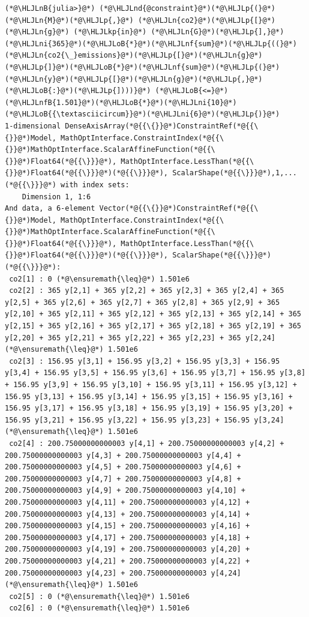 \documentclass[12pt,a4paper]{article}
\newcommand{\HLJLkp}[1]{\textcolor[RGB]{148,91,176}{\textbf{#1}}}
\newcommand{\HLJLn}[1]{#1}
\newcommand{\HLJLnd}[1]{\textcolor[RGB]{214,102,97}{#1}}
\newcommand{\HLJLnf}[1]{\textcolor[RGB]{66,102,213}{#1}}
\newcommand{\HLJLnB}[1]{\textcolor[RGB]{59,151,46}{#1}}
\newcommand{\HLJLnfB}[1]{\textcolor[RGB]{59,151,46}{#1}}
\newcommand{\HLJLni}[1]{\textcolor[RGB]{59,151,46}{#1}}
\newcommand{\HLJLoB}[1]{\textcolor[RGB]{102,102,102}{\textbf{#1}}}
\newcommand{\HLJLp}[1]{#1}
\begin{document}
\begin{lstlisting}
(*@\HLJLnB{julia>}@*) (*@\HLJLnd{@constraint}@*)(*@\HLJLp{(}@*)(*@\HLJLn{M}@*)(*@\HLJLp{,}@*) (*@\HLJLn{co2}@*)(*@\HLJLp{[}@*)(*@\HLJLn{g}@*) (*@\HLJLkp{in}@*) (*@\HLJLn{G}@*)(*@\HLJLp{],}@*) (*@\HLJLni{365}@*)(*@\HLJLoB{*}@*)(*@\HLJLnf{sum}@*)(*@\HLJLp{((}@*)(*@\HLJLn{co2{\_}emissions}@*)(*@\HLJLp{[}@*)(*@\HLJLn{g}@*)(*@\HLJLp{]}@*)(*@\HLJLoB{*}@*)(*@\HLJLnf{sum}@*)(*@\HLJLp{(}@*)(*@\HLJLn{y}@*)(*@\HLJLp{[}@*)(*@\HLJLn{g}@*)(*@\HLJLp{,}@*)(*@\HLJLoB{:}@*)(*@\HLJLp{])))}@*) (*@\HLJLoB{<=}@*) (*@\HLJLnfB{1.501}@*)(*@\HLJLoB{*}@*)(*@\HLJLni{10}@*)(*@\HLJLoB{{\textasciicircum}}@*)(*@\HLJLni{6}@*)(*@\HLJLp{)}@*)
1-dimensional DenseAxisArray(*@{{\{}}@*)ConstraintRef(*@{{\{}}@*)Model, MathOptInterface.ConstraintIndex(*@{{\{}}@*)MathOptInterface.ScalarAffineFunction(*@{{\{}}@*)Float64(*@{{\}}}@*), MathOptInterface.LessThan(*@{{\{}}@*)Float64(*@{{\}}}@*)(*@{{\}}}@*), ScalarShape(*@{{\}}}@*),1,...(*@{{\}}}@*) with index sets:
    Dimension 1, 1:6
And data, a 6-element Vector(*@{{\{}}@*)ConstraintRef(*@{{\{}}@*)Model, MathOptInterface.ConstraintIndex(*@{{\{}}@*)MathOptInterface.ScalarAffineFunction(*@{{\{}}@*)Float64(*@{{\}}}@*), MathOptInterface.LessThan(*@{{\{}}@*)Float64(*@{{\}}}@*)(*@{{\}}}@*), ScalarShape(*@{{\}}}@*)(*@{{\}}}@*):
 co2[1] : 0 (*@\ensuremath{\leq}@*) 1.501e6
 co2[2] : 365 y[2,1] + 365 y[2,2] + 365 y[2,3] + 365 y[2,4] + 365 y[2,5] + 365 y[2,6] + 365 y[2,7] + 365 y[2,8] + 365 y[2,9] + 365 y[2,10] + 365 y[2,11] + 365 y[2,12] + 365 y[2,13] + 365 y[2,14] + 365 y[2,15] + 365 y[2,16] + 365 y[2,17] + 365 y[2,18] + 365 y[2,19] + 365 y[2,20] + 365 y[2,21] + 365 y[2,22] + 365 y[2,23] + 365 y[2,24] (*@\ensuremath{\leq}@*) 1.501e6
 co2[3] : 156.95 y[3,1] + 156.95 y[3,2] + 156.95 y[3,3] + 156.95 y[3,4] + 156.95 y[3,5] + 156.95 y[3,6] + 156.95 y[3,7] + 156.95 y[3,8] + 156.95 y[3,9] + 156.95 y[3,10] + 156.95 y[3,11] + 156.95 y[3,12] + 156.95 y[3,13] + 156.95 y[3,14] + 156.95 y[3,15] + 156.95 y[3,16] + 156.95 y[3,17] + 156.95 y[3,18] + 156.95 y[3,19] + 156.95 y[3,20] + 156.95 y[3,21] + 156.95 y[3,22] + 156.95 y[3,23] + 156.95 y[3,24] (*@\ensuremath{\leq}@*) 1.501e6
 co2[4] : 200.75000000000003 y[4,1] + 200.75000000000003 y[4,2] + 200.75000000000003 y[4,3] + 200.75000000000003 y[4,4] + 200.75000000000003 y[4,5] + 200.75000000000003 y[4,6] + 200.75000000000003 y[4,7] + 200.75000000000003 y[4,8] + 200.75000000000003 y[4,9] + 200.75000000000003 y[4,10] + 200.75000000000003 y[4,11] + 200.75000000000003 y[4,12] + 200.75000000000003 y[4,13] + 200.75000000000003 y[4,14] + 200.75000000000003 y[4,15] + 200.75000000000003 y[4,16] + 200.75000000000003 y[4,17] + 200.75000000000003 y[4,18] + 200.75000000000003 y[4,19] + 200.75000000000003 y[4,20] + 200.75000000000003 y[4,21] + 200.75000000000003 y[4,22] + 200.75000000000003 y[4,23] + 200.75000000000003 y[4,24] (*@\ensuremath{\leq}@*) 1.501e6
 co2[5] : 0 (*@\ensuremath{\leq}@*) 1.501e6
 co2[6] : 0 (*@\ensuremath{\leq}@*) 1.501e6


\end{lstlisting}
\end{document}
